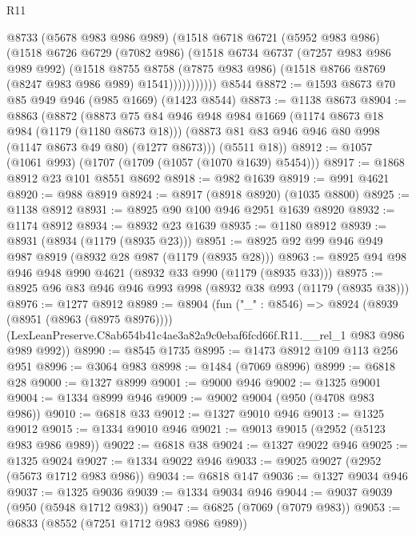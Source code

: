 \begin{lexlean}{R11}
\begin{coremodule}
                @8733
                (@5678 @983 @986 @989)
                (@1518
                  @6718
                  @6721
                  (@5952 @983 @986)
                  (@1518
                    @6726
                    @6729
                    (@7082 @986)
                    (@1518
                      @6734
                      @6737
                      (@7257 @983 @986 @989 @992)
                      (@1518
                        @8755
                        @8758
                        (@7875 @983 @986)
                        (@1518 @8766 @8769 (@8247 @983 @986 @989) @1541)))))))))))
    @8544
@8872 := @1593 @8673 @70 @85 @949 @946 (@985 @1669) (@1423 @8544)
@8873 := @1138 @8673
@8904 := @8863
    (@8872
      (@8873
        @75
        @84
        @946
        @948
        @984
        @1669
        (@1174 @8673 @18 @984 (@1179 (@1180 @8673 @18)))
        (@8873 @81 @83 @946 @946 @80 @998 (@1147 @8673 @49 @80) (@1277 @8673)))
      (@5511 @18))
@8912 := @1057 (@1061 @993) (@1707 (@1709 (@1057 (@1070 @1639) @5454)))
@8917 := @1868 @8912 @23 @101 @8551 @8692
@8918 := @982 @1639
@8919 := @991 @4621
@8920 := @988 @8919
@8924 := @8917 (@8918 @8920) (@1035 @8800)
@8925 := @1138 @8912
@8931 := @8925 @90 @100 @946 @2951 @1639 @8920
@8932 := @1174 @8912
@8934 := @8932 @23 @1639
@8935 := @1180 @8912
@8939 := @8931 (@8934 (@1179 (@8935 @23)))
@8951 := @8925 @92 @99 @946 @949 @987 @8919 (@8932 @28 @987 (@1179 (@8935 @28)))
@8963 := @8925 @94 @98 @946 @948 @990 @4621 (@8932 @33 @990 (@1179 (@8935 @33)))
@8975 := @8925 @96 @83 @946 @946 @993 @998 (@8932 @38 @993 (@1179 (@8935 @38)))
@8976 := @1277 @8912
@8989 := @8904
    (fun ("_" : @8546) =>
    @8924
      (@8939 (@8951 (@8963 (@8975 @8976))))
      (LexLeanPreserve.C8ab654b41c4ae3a82a9c0ebaf6fcd66f.R11.__rel_1 @983 @986 @989 @992))
@8990 := @8545 @1735
@8995 := @1473 @8912 @109 @113 @256 @951
@8996 := @3064 @983
@8998 := @1484 (@7069 @8996)
@8999 := @6818 @28
@9000 := @1327 @8999
@9001 := @9000 @946
@9002 := @1325 @9001
@9004 := @1334 @8999 @946
@9009 := @9002 @9004 (@950 (@4708 @983 @986))
@9010 := @6818 @33
@9012 := @1327 @9010 @946
@9013 := @1325 @9012
@9015 := @1334 @9010 @946
@9021 := @9013 @9015 (@2952 (@5123 @983 @986 @989))
@9022 := @6818 @38
@9024 := @1327 @9022 @946
@9025 := @1325 @9024
@9027 := @1334 @9022 @946
@9033 := @9025 @9027 (@2952 (@5673 @1712 @983 @986))
@9034 := @6818 @147
@9036 := @1327 @9034 @946
@9037 := @1325 @9036
@9039 := @1334 @9034 @946
@9044 := @9037 @9039 (@950 (@5948 @1712 @983))
@9047 := @6825 (@7069 (@7079 @983))
@9053 := @6833 (@8552 (@7251 @1712 @983 @986 @989))

\end{coremodule}
\end{lexlean}
